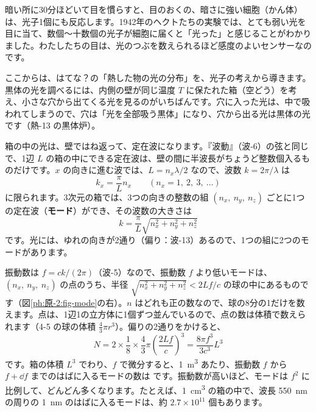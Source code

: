 \begin{phmijika}
暗い所に30分ほどいて目を慣らすと、目のおくの、暗さに強い細胞（かん体）は、光子1個にも反応します。1942年のヘクトたちの実験では、とても弱い光を目に当て、数個〜十数個の光子が細胞に届くと「光った」と感じることがわかりました。わたしたちの目は、光のつぶを数えられるほど感度のよいセンサーなのです。
\end{phmijika}

\phkokomade


\label{ph:原-2:sec9}
ここからは、はてな？の「熱した物の光の分布」を、光子の考えから導きます。黒体の光を調べるには、内側の壁が同じ温度 $T$ に保たれた箱（空どう）を考え、小さな穴から出てくる光を見るのがいちばんです。穴に入った光は、中で吸われてしまうので、穴は「光を全部吸う黒体」になり、穴から出る光は黒体の光です（熱-13 の黒体炉）。

箱の中の光は、壁ではね返って、定在波になります。『波動』（波-6）の弦と同じで、1辺 $L$ の箱の中にできる定在波は、壁の間に半波長がちょうど整数個入るものだけです。$x$ の向きに進む波では、$L=n_x\lambda/2$ なので、波数 $k=2\pi/\lambda$ は
\[ k_x=\frac{\pi}{L}n_x\qquad(n_x=1,\ 2,\ 3,\ \ldots) \]
に限られます。3次元の箱では、3つの向きの整数の組 $(n_x,\ n_y,\ n_z)$ ごとに1つの定在波（\textbf{モード}）ができ、その波数の大きさは
\[ k=\frac{\pi}{L}\sqrt{n_x^2+n_y^2+n_z^2} \]
です。光には、ゆれの向きが2通り（偏り：波-13）あるので、1つの組に2つのモードがあります。

振動数は $f=ck/(2\pi)$（波-5）なので、振動数 $f$ より低いモードは、$(n_x,\ n_y,\ n_z)$ の点のうち、半径 $\sqrt{n_x^2+n_y^2+n_z^2}<2Lf/c$ の球の中にあるものです（図\ref{ph:原-2:fig-mode}の右）。$n$ はどれも正の数なので、球の8分の1だけを数えます。点は、1辺1の立方体に1個ずつ並んでいるので、点の数は体積で数えられます（4-5 の球の体積 $\tfrac43\pi r^3$）。偏りの2通りをかけると、
\[ N=2\times\frac18\times\frac43\pi\left(\frac{2Lf}{c}\right)^3=\frac{8\pi f^3}{3c^3}L^3 \]
です。箱の体積 $L^3$ でわり、$f$ で微分すると、\qty{1}{m^3} あたり、振動数 $f$ から $f+\dd f$ までのはばに入るモードの数は
\label{ph:原-2:modes}です。振動数が高いほど、モードは $f^2$ に比例して、どんどん多くなります。たとえば、\qty{1}{cm^3} の箱の中で、波長 \qty{550}{nm} の周りの \qty{1}{nm} のはばに入るモードは、約 $2.7\times10^{11}$ 個もあります。

